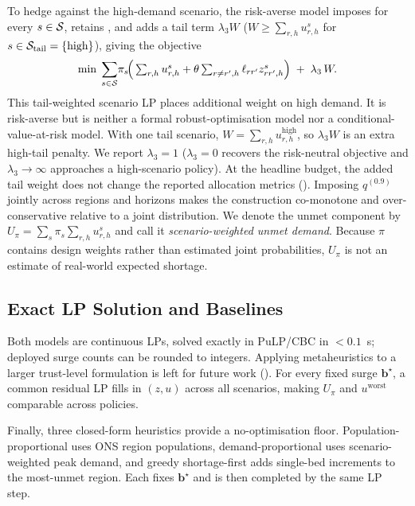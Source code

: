 To hedge against the high-demand scenario, the risk-averse model imposes
 for every $s\in\mathcal{S}$,
retains , and adds a tail term $\lambda_3 W$
($W\geq\sum_{r,h} u_{r,h}^s$ for $s\in\mathcal{S}_{\text{tail}}=\{\text{high}\}$),
giving the objective
\begin{equation}\label{eq:robust_objective}
\min\;
\sum_{s\in\mathcal{S}}\!\pi_s\!\Big(
\textstyle\sum_{r,h} u_{r,h}^s + \theta \sum_{r\neq r',h} \ell_{r r'} z_{r r',h}^s
\Big)\;+\;\lambda_3\, W.
\end{equation}
This tail-weighted scenario LP places additional weight on high demand.
It is risk-averse but is neither a formal robust-optimisation model nor
a conditional-value-at-risk model. With one tail scenario,
$W=\sum_{r,h}u_{r,h}^{\text{high}}$, so $\lambda_3W$ is an extra high-tail
penalty. We report $\lambda_3{=}1$
($\lambda_3{=}0$ recovers the risk-neutral objective and
$\lambda_3\!\to\!\infty$ approaches a high-scenario policy). At the
headline budget, the added tail weight does not change the reported
allocation metrics (). Imposing
$q^{(0.9)}$ jointly across regions and horizons makes the construction
co-monotone and over-conservative relative to a joint distribution.
We denote the unmet component by
$U_\pi=\sum_s\pi_s\sum_{r,h}u_{r,h}^s$ and call it \emph{scenario-weighted unmet demand}. Because $\pi$ contains design
weights rather than estimated joint probabilities, $U_\pi$ is not an
estimate of real-world expected shortage.

\subsection{Exact LP Solution and Baselines}\label{ssec:solvers}

Both models are continuous LPs, solved exactly in PuLP/CBC in
$<\!0.1$~s; deployed surge counts can be rounded to integers.
Applying metaheuristics to a larger trust-level formulation is left for
future work
(). For every fixed surge $\mathbf b^\star$, a common residual LP fills in
$(z,u)$ across all scenarios, making $U_\pi$ and $u^{\text{worst}}$
comparable across policies.

Finally, three closed-form heuristics provide a no-optimisation floor.
Population-proportional uses ONS region populations,
demand-proportional uses scenario-weighted peak demand, and greedy
shortage-first adds single-bed increments to the most-unmet
region. Each fixes $\mathbf{b}^\star$ and is then completed by the same LP step.
